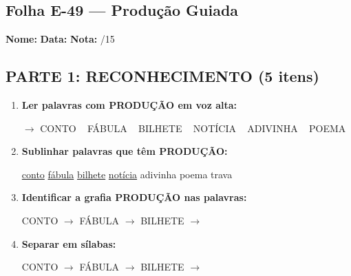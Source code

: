 \subsection{Folha E-49 --- Produção Guiada}
\begin{exercicio}



\noindent\textbf{Nome:} \underline{\hspace{3.2cm}} \quad \textbf{Data:} \underline{\hspace{1.6cm}} \quad \textbf{Nota:} \underline{\hspace{0.9cm}}/15


\subsection*{PARTE 1: RECONHECIMENTO (5 itens)}

\begin{enumerate}

  \item \textbf{Ler palavras com PRODUÇÃO em voz alta:}
  \begin{center}
  $\rightarrow$ CONTO ~ FÁBULA ~ BILHETE ~ NOTÍCIA ~ ADIVINHA ~ POEMA
  \end{center}

  \item \textbf{Sublinhar palavras que têm PRODUÇÃO:}

\begin{center}
  \uline{conto} \quad \uline{fábula} \quad \uline{bilhete} \quad \uline{notícia} \quad adivinha \quad poema \quad trava
\end{center}

  \item \textbf{Identificar a grafia PRODUÇÃO nas palavras:}
  \begin{center}
  CONTO $\rightarrow$ \underline{\hspace{1cm}} \quad FÁBULA $\rightarrow$ \underline{\hspace{1cm}} \quad BILHETE $\rightarrow$ \underline{\hspace{1cm}}
  \end{center}

  \item \textbf{Separar em sílabas:}
  \begin{center}
  CONTO $\rightarrow$ \underline{\hspace{1.2cm}} \quad FÁBULA $\rightarrow$ \underline{\hspace{1.2cm}} \quad BILHETE $\rightarrow$ \underline{\hspace{1.2cm}}
  \end{center}


\end{enumerate}
\end{exercicio}
